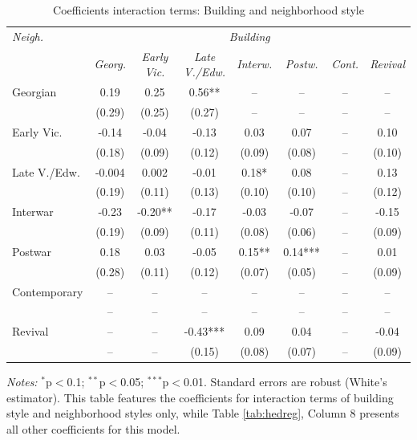 \documentclass[]{article}
\begin{document}
\begin{table}[ht]
\centering
\caption{Coefficients interaction terms: Building and neighborhood style}
\label{tab:hedregint}
\begin{tabular}{lccccccc}
\toprule
\emph{Neigh.} & \multicolumn{7}{c}{\emph{Building}} \\
 \cmidrule(lr){1-1}
 \cmidrule(lr){2-8}
& \emph{Georg.} & \emph{Early Vic.} & \emph{Late V./Edw.} & \emph{Interw.} & \emph{Postw.} & \emph{Cont.} & \emph{Revival} \\ 
  \cmidrule(lr){2-8}

Georgian & 0.19 & 0.25 & 0.56** & -- & -- & -- & -- \\ 
   & (0.29) & (0.25) & (0.27) & -- & -- & -- & -- \\ 
Early Vic. & -0.14 & -0.04 & -0.13 & 0.03 & 0.07 & -- & 0.10 \\ 
  & (0.18) & (0.09) & (0.12) & (0.09) & (0.08) & -- & (0.10) \\ 
Late V./Edw. & -0.004 & 0.002 & -0.01 & 0.18* & 0.08 & -- & 0.13 \\ 
   & (0.19) & (0.11) & (0.13) & (0.10) & (0.10) & -- & (0.12) \\ 
Interwar & -0.23 & -0.20** & -0.17 & -0.03 & -0.07 & -- & -0.15 \\ 
  & (0.19) & (0.09) & (0.11) & (0.08) & (0.06) & -- & (0.09) \\ 
Postwar & 0.18 & 0.03 & -0.05 & 0.15** & 0.14*** & -- & 0.01 \\ 
   & (0.28) & (0.11) & (0.12) & (0.07) & (0.05) & -- & (0.09) \\ 
Contemporary & -- & -- & -- & -- & -- & -- & -- \\ 
  & -- & -- & -- & -- & -- & -- & -- \\ 
  Revival & -- & -- & -0.43*** & 0.09 & 0.04 & -- & -0.04 \\ 
   & -- & -- & (0.15) & (0.08) & (0.07) & -- & (0.09) \\ 
\bottomrule
\end{tabular}
\begin{minipage}{\textwidth}
\vspace{0.25cm}
\footnotesize \emph{Notes:} $^{*}$p$<$0.1; $^{**}$p$<$0.05; $^{***}$p$<$0.01. Standard errors are robust (White's estimator). This table features the coefficients for interaction terms of building style and neighborhood styles only, while Table \ref{tab:hedreg}, Column 8 presents all other coefficients for this model.
\end{minipage}
\end{table}
\end{document}
